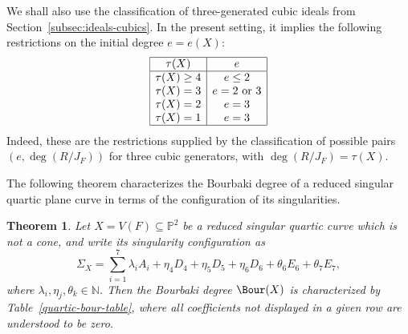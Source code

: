 \documentclass[11pt]{amsart} %
\newtheorem{Theorem}{Theorem}[section]
\theoremstyle{definition}
\def\NN{\mathbb N}
\def\NN{\mathbb N}
\def\NZQ{\mathbb}               %
\def\NN{{\NZQ N}}
\def\PP{{\NZQ P}}
\begin{document}
We shall also use the classification of three-generated cubic ideals from Section~\ref{subsec:ideals-cubics}. In the present setting, it implies the following restrictions on the initial degree $e=e(X)$:
\[
\begin{array}{|c|c|}
\hline
\tau(X) & e\\
\hline
\tau(X)\geq4 & e\leq2\\
\tau(X)=3 & e=2\text{ or }3\\
\tau(X)=2 & e=3\\
\tau(X)=1 & e=3\\
\hline
\end{array}
\]
Indeed, these are the restrictions supplied by the classification of possible pairs $(e,\deg(R/J_F))$ for three cubic generators, with $\deg(R/J_F)=\tau(X)$.

The following theorem characterizes the Bourbaki degree of a reduced singular quartic plane curve in terms of the configuration of its singularities.

\begin{Theorem}\label{Bour-Quartic}
Let $X=V(F)\subseteq \PP^2$ be a reduced singular quartic curve which is not a cone, and write its singularity configuration as
$$
\Sigma_X=\sum_{i=1}^{7}\lambda_iA_i+\eta_4D_4+\eta_5D_5+\eta_6D_6+\theta_6E_6+\theta_7E_7,
$$
where $\lambda_i,\eta_j,\theta_k\in\NN$. Then the Bourbaki degree
$\Bour(X)$ is characterized by Table~\ref{quartic-bour-table}, where
all coefficients not displayed in a given row are understood to be zero.
\end{Theorem}
\end{document}
